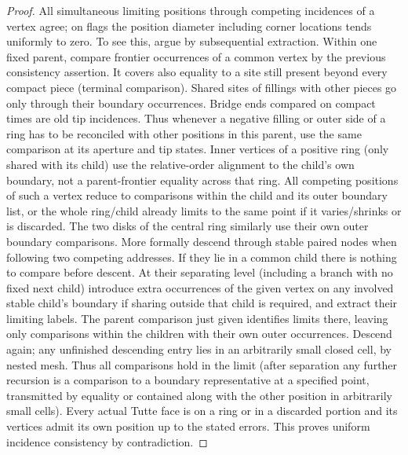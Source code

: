 \begin{proof}

All simultaneous limiting positions through competing incidences of a vertex agree; on flags the position diameter including corner locations tends uniformly to zero.
To see this, argue by subsequential extraction.
Within one fixed parent, compare frontier occurrences of a common vertex by the previous consistency assertion.
It covers also equality to a site still present beyond every compact piece (terminal comparison).
Shared sites of fillings with other pieces go only through their boundary occurrences.
Bridge ends compared on compact times are old tip incidences.
Thus whenever a negative filling or outer side of a ring has to be reconciled with other positions in this parent, use the same comparison at its aperture and tip states.
Inner vertices of a positive ring (only shared with its child) use the relative-order alignment to the child's own boundary, not a parent-frontier equality across that ring.
All competing positions of such a vertex reduce to comparisons within the child and its outer boundary list, or the whole ring/child already limits to the same point if it varies/shrinks or is discarded.
The two disks of the central ring similarly use their own outer boundary comparisons.
More formally descend through stable paired nodes when following two competing addresses.
If they lie in a common child there is nothing to compare before descent.
At their separating level (including a branch with no fixed next child) introduce extra occurrences of the given vertex on any involved stable child's boundary if sharing outside that child is required, and extract their limiting labels.
The parent comparison just given identifies limits there, leaving only comparisons within the children with their own outer occurrences.
Descend again; any unfinished descending entry lies in an arbitrarily small closed cell, by nested mesh.
Thus all comparisons hold in the limit (after separation any further recursion is a comparison to a boundary representative at a specified point, transmitted by equality or contained along with the other position in arbitrarily small cells).
Every actual Tutte face is on a ring or in a discarded portion and its vertices admit its own position up to the stated errors.
This proves uniform incidence consistency by contradiction.



\end{proof}
